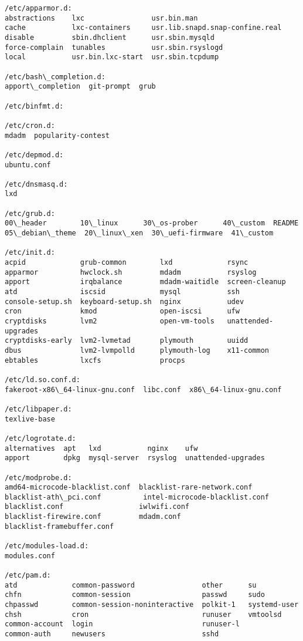 \documentclass[11pt]{article}
\begin{document}
    \begin{Verbatim}[commandchars=\\\{\}]
/etc/apparmor.d:
abstractions    lxc                usr.bin.man
cache           lxc-containers     usr.lib.snapd.snap-confine.real
disable         sbin.dhclient      usr.sbin.mysqld
force-complain  tunables           usr.sbin.rsyslogd
local           usr.bin.lxc-start  usr.sbin.tcpdump

/etc/bash\_completion.d:
apport\_completion  git-prompt  grub

/etc/binfmt.d:

/etc/cron.d:
mdadm  popularity-contest

/etc/depmod.d:
ubuntu.conf

/etc/dnsmasq.d:
lxd

/etc/grub.d:
00\_header        10\_linux      30\_os-prober      40\_custom  README
05\_debian\_theme  20\_linux\_xen  30\_uefi-firmware  41\_custom

/etc/init.d:
acpid             grub-common        lxd             rsync
apparmor          hwclock.sh         mdadm           rsyslog
apport            irqbalance         mdadm-waitidle  screen-cleanup
atd               iscsid             mysql           ssh
console-setup.sh  keyboard-setup.sh  nginx           udev
cron              kmod               open-iscsi      ufw
cryptdisks        lvm2               open-vm-tools   unattended-upgrades
cryptdisks-early  lvm2-lvmetad       plymouth        uuidd
dbus              lvm2-lvmpolld      plymouth-log    x11-common
ebtables          lxcfs              procps

/etc/ld.so.conf.d:
fakeroot-x86\_64-linux-gnu.conf  libc.conf  x86\_64-linux-gnu.conf

/etc/libpaper.d:
texlive-base

/etc/logrotate.d:
alternatives  apt   lxd           nginx    ufw
apport        dpkg  mysql-server  rsyslog  unattended-upgrades

/etc/modprobe.d:
amd64-microcode-blacklist.conf  blacklist-rare-network.conf
blacklist-ath\_pci.conf          intel-microcode-blacklist.conf
blacklist.conf                  iwlwifi.conf
blacklist-firewire.conf         mdadm.conf
blacklist-framebuffer.conf

/etc/modules-load.d:
modules.conf

/etc/pam.d:
atd             common-password                other      su
chfn            common-session                 passwd     sudo
chpasswd        common-session-noninteractive  polkit-1   systemd-user
chsh            cron                           runuser    vmtoolsd
common-account  login                          runuser-l
common-auth     newusers                       sshd


\end{Verbatim}
\end{document}
